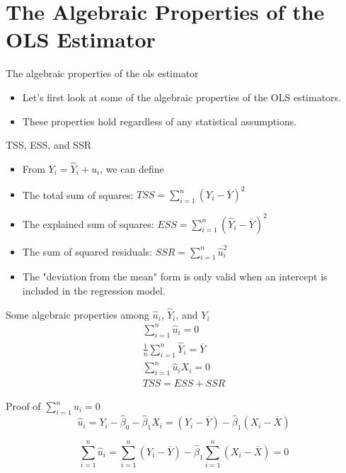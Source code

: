 \documentclass[presentation]{beamer}
\begin{document}
\section{The Algebraic Properties of the OLS Estimator}
\label{sec:org7dc8f7a}

\begin{frame}[label={sec:orgc4bcd12}]{The algebraic properties of the ols estimator}
\begin{itemize}
\item Let's first look at some of the algebraic properties of the OLS
estimators.
\item These properties hold regardless of any statistical assumptions.
\end{itemize}
\end{frame}

\begin{frame}[label={sec:org1318041}]{TSS, ESS, and SSR}
\begin{itemize}
\item From \(Y_i = \hat{Y}_i + \hat{u}_i\), we can define
\item \alert{The total sum of squares}: \(TSS = \sum_{i=1}^n (Y_i - \overline{Y})^2\)
\item \alert{The explained sum of squares}: \(ESS = \sum_{i=1}^n (\hat{Y}_i - \overline{Y})^2\)
\item \alert{The sum of squared residuals}: \(SSR = \sum_{i=1}^n \hat{u}_i^2\)
\item The "deviation from the mean" form is only valid when an intercept
is included in the regression model.
\end{itemize}
\end{frame}

\begin{frame}[label={sec:org2c20935}]{Some algebraic properties among \(\hat{u}_i\), \(\hat{Y}_i\), and \(Y_i\)}
\begin{gather}
\sum_{i=1}^n \hat{u}_i = 0 \label{eq:algebra-ols-1} \\
\frac{1}{n} \sum_{i=1}^n \hat{Y}_i = \overline{Y} \label{eq:algebra-ols-2} \\
\sum_{i=1}^n \hat{u}_i X_i = 0 \label{eq:algebra-ols-3} \\
TSS = ESS + SSR \label{eq:tss-ess}
\end{gather}
\end{frame}

\begin{frame}[label={sec:org0355b94}]{Proof of \(\sum_{i=1}^n \hat{u}_i = 0\)}
\[\hat{u}_i = Y_i - \hat{\beta}_0 - \hat{\beta}_1 X_i = (Y_i -
\overline{Y}) - \hat{\beta}_1 (X_i - \overline{X})\]

\[\sum_{i=1}^n \hat{u}_i = \sum_{i=1}^n (Y_i - \overline{Y}) -
\hat{\beta}_1 \sum_{i=1}^n (X_i - \overline{X}) = 0\]
\end{frame}
\end{document}

